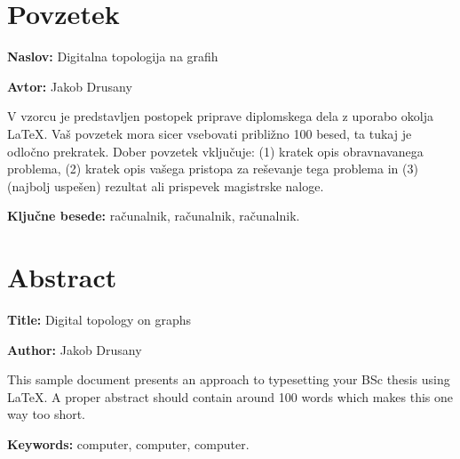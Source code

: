 \documentclass[a4paper, 12pt]{book}
\newcommand{\ttitle}{Digitalna topologija na grafih}
\newcommand{\ttitleEn}{Digital topology on graphs}
\newcommand{\tauthor}{Jakob Drusany}
\newcommand{\tkeywords}{računalnik, računalnik, računalnik}
\newcommand{\tkeywordsEn}{computer, computer, computer}
\newcommand{\clearemptydoublepage}{\newpage{\pagestyle{empty}\cleardoublepage}}
\theoremstyle{definition}
\begin{document}
\chapter*{Povzetek}

\noindent\textbf{Naslov:} \ttitle
\bigskip

\noindent\textbf{Avtor:} \tauthor
\bigskip

\noindent V vzorcu je predstavljen postopek priprave diplomskega dela z uporabo okolja \LaTeX. Vaš povzetek mora sicer vsebovati približno 100 besed, ta tukaj je odločno prekratek.
Dober povzetek vključuje: (1) kratek opis obravnavanega problema, (2) kratek opis vašega pristopa za reševanje tega problema in (3) (najbolj uspešen) rezultat ali prispevek magistrske naloge.

\bigskip

\noindent\textbf{Ključne besede:} \tkeywords.
\clearemptydoublepage

\chapter*{Abstract}

\noindent\textbf{Title:} \ttitleEn
\bigskip

\noindent\textbf{Author:} \tauthor
\bigskip

\noindent This sample document presents an approach to typesetting your BSc thesis using \LaTeX. 
A proper abstract should contain around 100 words which makes this one way too short.
\bigskip

\noindent\textbf{Keywords:} \tkeywordsEn.
\clearemptydoublepage
\fi
\mainmatter
\setcounter{page}{1}
\pagestyle{fancy}
\end{document}
